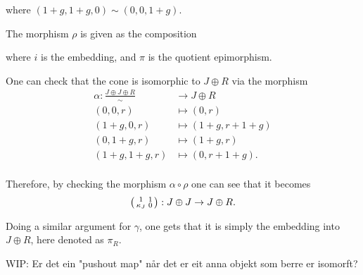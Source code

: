 \begin{example}
\begin{center}
	\end{center}
	where \( (1 + g, 1 + g, 0) \sim (0, 0, 1 + g) \).

	The morphism \( \rho \) is given as the composition
	\begin{center}
	\end{center}
	where \( i \) is the embedding, and \( \pi \) is the quotient epimorphism.

	One can check that the cone is isomorphic to \( J \oplus R \) via the morphism
	\begin{align*}
		\alpha: \frac{J \oplus J \oplus R}{\sim} &\to J \oplus R \\
		(0, 0, r) &\mapsto (0, r) \\
		(1 + g, 0, r) &\mapsto (1 + g, r + 1 + g) \\
		(0, 1 + g, r) &\mapsto (1 + g, r) \\
		(1 + g, 1 + g, r) &\mapsto (0, r + 1 + g). \\
	\end{align*}

	Therefore, by checking the morphism \( \alpha \circ \rho \) one can see that it becomes
	\[
		\begin{psmallmatrix}
			1 & 1 \\
			\kappa_J & 0 \\
		\end{psmallmatrix}:  J \oplus J \to J \oplus R.
	\]

	Doing a similar argument for \( \gamma \), one gets that it is simply the embedding into \( J \oplus R \), here denoted as \( \pi_R \).

	WIP: Er det ein "pushout map" når det er eit anna objekt som berre er isomorft?
	

\end{example}
